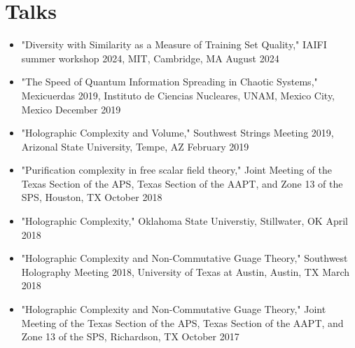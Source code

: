 \section*{Talks}
\begin{itemize}

\item "Diversity with Similarity as a Measure of Training Set Quality," IAIFI summer workshop 2024, MIT, Cambridge, MA \hfill August 2024

\item "The Speed of Quantum Information Spreading in Chaotic Systems," Mexicuerdas 2019, Instituto de Ciencias Nucleares, UNAM, Mexico City, Mexico \hfill December 2019

\item "Holographic Complexity and Volume," Southwest Strings Meeting 2019, Arizonal State University, Tempe, AZ \hfill February 2019

\item "Purification complexity in free scalar field theory," Joint Meeting of the Texas Section of the APS, Texas Section of the AAPT, and Zone 13 of the SPS, Houston, TX \hfill October 2018

\item "Holographic Complexity," Oklahoma State Universtiy, Stillwater, OK \hfill April 2018

\item "Holographic Complexity and Non-Commutative Guage Theory," Southwest Holography Meeting 2018, University of Texas at Austin, Austin, TX \hfill March 2018

\item "Holographic Complexity and Non-Commutative Guage Theory," Joint Meeting of the Texas Section of the APS, Texas Section of the AAPT, and Zone 13 of the SPS, Richardson, TX \hfill October 2017

\end{itemize}

